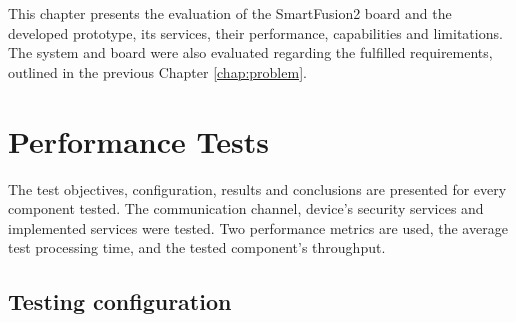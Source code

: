 \cleardoublepage
\label{chap:evaluation}

This chapter presents the evaluation of the SmartFusion2 board and the developed prototype, its services, their performance, capabilities and limitations. The system and board were also evaluated regarding the fulfilled requirements, outlined in the previous Chapter \ref{chap:problem}.

\section{Performance Tests}\label{chap:evaluation:performance}

The test objectives, configuration, results and conclusions are presented for every component tested.
The communication channel, device's security services and implemented services were tested.
Two performance metrics are used, the average test processing time, and the tested component's throughput.

\subsection{Testing configuration}\label{chap:evaluation:performance:config}

